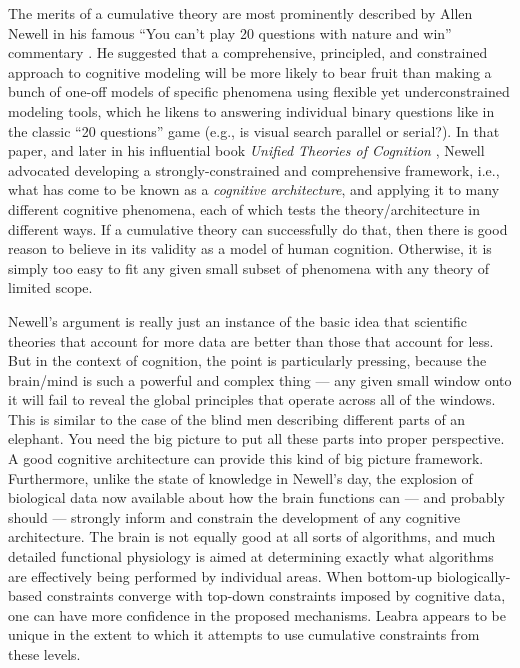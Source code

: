\documentclass[11pt,twoside]{article}
\begin{document}
The merits of a cumulative theory are most prominently described by Allen
Newell in his famous ``You can't play 20 questions with nature and win''
commentary \cite{Newell73}.  He suggested that a comprehensive, principled,
and constrained approach to cognitive modeling will be more likely to bear
fruit than making a bunch of one-off models of specific phenomena using
flexible yet underconstrained modeling tools, which he likens to answering
individual binary questions like in the classic ``20 questions'' game (e.g.,
is visual search parallel or serial?).  In that paper, and later in his
influential book {\em Unified Theories of Cognition} , Newell
advocated developing a strongly-constrained and comprehensive framework, i.e.,
what has come to be known as a {\em cognitive architecture}, and applying it
to many different cognitive phenomena, each of which tests the
theory/architecture in different ways.  If a cumulative theory can
successfully do that, then there is good reason to believe in its validity as
a model of human cognition.  Otherwise, it is simply too easy to fit any given
small subset of phenomena with any theory of limited scope.

Newell's argument is really just an instance of the basic idea that scientific
theories that account for more data are better than those that account for
less.  But in the context of cognition, the point is particularly pressing,
because the brain/mind is such a powerful and complex thing --- any given
small window onto it will fail to reveal the global principles that operate
across all of the windows.  This is similar to the case of the blind men
describing different parts of an elephant.  You need the big picture to put
all these parts into proper perspective.  A good cognitive architecture can
provide this kind of big picture framework.  Furthermore, unlike the state of
knowledge in Newell's day, the explosion of biological data now available
about how the brain functions can --- and probably should --- strongly inform
and constrain the development of any cognitive architecture.  The brain is not
equally good at all sorts of algorithms, and much detailed functional
physiology is aimed at determining exactly what algorithms are effectively
being performed by individual areas.  When bottom-up biologically-based
constraints converge with top-down constraints imposed by cognitive data, one
can have more confidence in the proposed mechanisms.  Leabra appears to be
unique in the extent to which it attempts to use cumulative constraints from
these levels.
\end{document}
